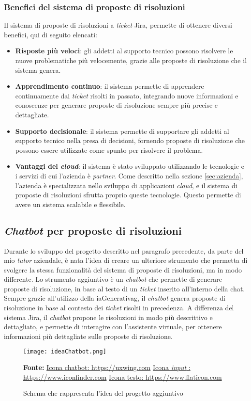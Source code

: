 \subsubsection{Benefici del sistema di proposte di risoluzioni}
Il sistema di proposte di risoluzioni a \textit{ticket} Jira, permette di ottenere diversi benefici, qui di seguito elencati:
\begin{itemize}
    \item \textbf{Risposte più veloci}: gli addetti al supporto tecnico possono risolvere le nuove problematiche più velocemente, grazie alle proposte di risoluzione che il sistema genera.
    \item \textbf{Apprendimento continuo}: il sistema permette di apprendere continuamente dai \textit{ticket} risolti in passato, integrando nuove informazioni e conoscenze per generare proposte di risoluzione sempre più precise e dettagliate.
    \item \textbf{Supporto decisionale}: il sistema permette di supportare gli addetti al supporto tecnico nella presa di decisioni, fornendo proposte di risoluzione che possono essere utilizzate come spunto per risolvere il problema.
    \item \textbf{Vantaggi del \textit{cloud}}: il sistema è stato sviluppato utilizzando le tecnologie e i servizi di cui l'azienda è \textit{partner}. Come descritto nella sezione \ref{sec:azienda}, l'azienda è specializzata nello sviluppo di applicazioni \textit{cloud}, e il sistema di proposte di risoluzioni sfrutta proprio queste tecnologie. Questo permette di avere un sistema scalabile e flessibile.
\end{itemize}
\subsection{\textit{Chatbot} per proposte di risoluzioni}
Durante lo sviluppo del progetto descritto nel paragrafo precedente, da parte del mio \textit{tutor} aziendale, è nata l'idea di creare un ulteriore strumento che permetta di svolgere la stessa funzionalità del sistema di proposte di risoluzioni, ma in modo differente. Lo strumento aggiuntivo è un \textit{chatbot} che permette di generare proposte di risoluzione, in base al testo di un \textit{ticket} inserito all'interno della chat. 
Sempre grazie all'utilizzo della \gls{iaGenerativag}, il \textit{chatbot} genera proposte di risoluzione in base al contesto dei \textit{ticket} risolti in precedenza. A differenza del sistema Jira, il \textit{chatbot} propone le risoluzioni in modo più descrittivo e dettagliato, e permette di interagire con l'assistente virtuale, per ottenere informazioni più dettagliate sulle proposte di risoluzione.
\begin{figure}[H]
    \centering
    \texttt{[image: ideaChatbot.png]}
    \caption{Schema che rappresenta l'idea del progetto aggiuntivo}
    \label{fig:ideaChatbot}
    \small \textbf{Fonte:} \href{https://uxwing.com/chatbot-icon/}{Icona chatbot: https://uxwing.com} \href{https://www.iconfinder.com/icons/351012/field_input_search_icon}{Icona \textit{input} : https://www.iconfinder.com} \href{https://www.flaticon.com/free-icon/text-file_5116156} {Icona testo: https://www.flaticon.com}
\end{figure}
